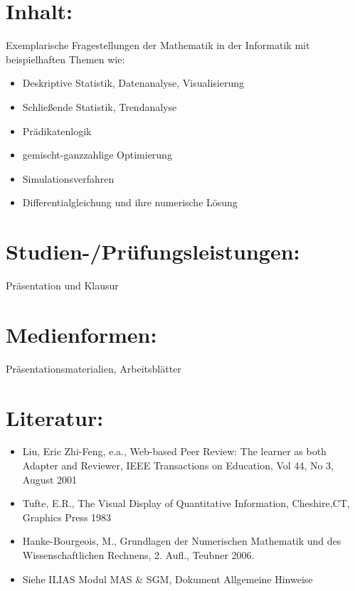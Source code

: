 \section*{Inhalt:}\label{inhalt-2}

Exemplarische Fragestellungen der Mathematik in der Informatik mit
beispielhaften Themen wie:

\begin{itemize}
\item
  Deskriptive Statistik, Datenanalyse, Visualisierung
\item
  Schließende Statistik, Trendanalyse
\item
  Prädikatenlogik
\item
  gemischt-ganzzahlige Optimierung
\item
  Simulationsverfahren
\item
  Differentialgleichung und ihre numerische Lösung
\end{itemize}

\section*{Studien-/Prüfungsleistungen:}\label{studien-pruxfcfungsleistungen-2}

Präsentation und Klausur

\section*{Medienformen:}\label{medienformen-2}

Präsentationsmaterialien, Arbeitsblätter

\section*{Literatur:}\label{literatur-2}

\begin{itemize}
\item
  Liu, Eric Zhi-Feng, e.a., Web-based Peer Review: The learner as both
  Adapter and Reviewer, IEEE Transactions on Education, Vol 44, No 3,
  August 2001
\item
  Tufte, E.R., The Visual Display of Quantitative Information,
  Cheshire,CT, Graphics Press 1983
\item
  Hanke-Bourgeois, M., Grundlagen der Numerischen Mathematik und des
  Wissenschaftlichen Rechnens, 2. Aufl., Teubner 2006.
\item
  Siehe ILIAS Modul MAS \& SGM, Dokument Allgemeine Hinweise
\end{itemize}

